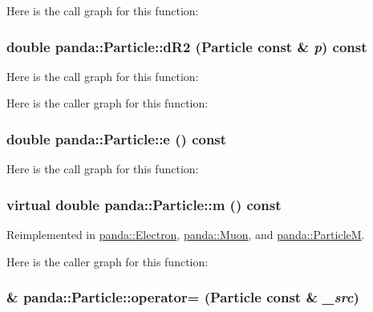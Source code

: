 Here is the call graph for this function:\hypertarget{classpanda_1_1Particle_a31b515f8bcd6d64227ec24dd4b9682c3}{
\subsubsection[{dR2}]{\setlength{\rightskip}{0pt plus 5cm}double panda::Particle::dR2 ({\bf Particle} const \& {\em p}) const}}
\label{classpanda_1_1Particle_a31b515f8bcd6d64227ec24dd4b9682c3}


Here is the call graph for this function:

Here is the caller graph for this function:\hypertarget{classpanda_1_1Particle_a7e352dd288ae0065303e5adc1ff3ba69}{
\subsubsection[{e}]{\setlength{\rightskip}{0pt plus 5cm}double panda::Particle::e () const}}
\label{classpanda_1_1Particle_a7e352dd288ae0065303e5adc1ff3ba69}


Here is the call graph for this function:\hypertarget{classpanda_1_1Particle_aa793c05fc1334ed462e18c794339eebf}{
\subsubsection[{m}]{\setlength{\rightskip}{0pt plus 5cm}virtual double panda::Particle::m () const}}
\label{classpanda_1_1Particle_aa793c05fc1334ed462e18c794339eebf}


Reimplemented in \hyperlink{classpanda_1_1Electron_a809cee4161783ff5d00b69e24c125759}{panda::Electron}, \hyperlink{classpanda_1_1Muon_ac5fc1640178d5b0d00dd3eefa6fd44fb}{panda::Muon}, and \hyperlink{classpanda_1_1ParticleM_a3285647972bb49a26897e300f990b902}{panda::ParticleM}.

Here is the caller graph for this function:\hypertarget{classpanda_1_1Particle_a8c4fabfceb39b746b0e68a7389e662c4}{
\subsubsection[{operator=}]{ \& panda::Particle::operator= ({\bf Particle} const \& {\em \_\-src})}}
\label{classpanda_1_1Particle_a8c4fabfceb39b746b0e68a7389e662c4}


